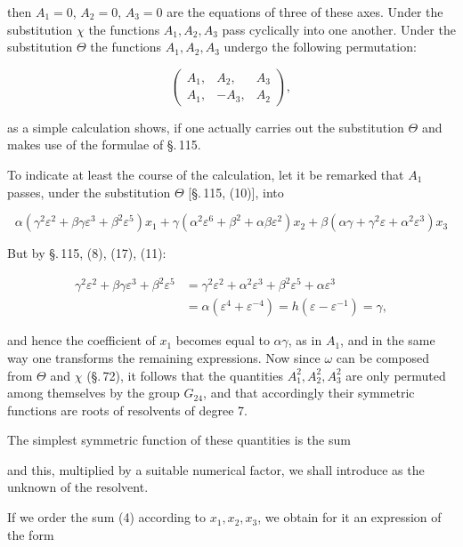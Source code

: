 
then $A_1=0$, $A_2=0$, $A_3=0$ are the equations of three of these axes. Under the substitution $\chi$ the functions $A_1, A_2, A_3$ pass cyclically into one another. Under the substitution $\Theta$ the functions $A_1, A_2, A_3$ undergo the following permutation:

\[
\begin{pmatrix} A_1, & A_2, & A_3 \\ A_1, & -A_3, & A_2 \end{pmatrix},
\]

as a simple calculation shows, if one actually carries out the substitution $\Theta$ and makes use of the formulae of \S.\,115.

To indicate at least the course of the calculation, let it be remarked that $A_1$ passes, under the substitution $\Theta$ [\S.\,115, (10)], into

\[
\alpha(\gamma^2\varepsilon^2 + \beta\gamma\varepsilon^3 + \beta^2\varepsilon^5)x_1 + \gamma(\alpha^2\varepsilon^6 + \beta^2 + \alpha\beta\varepsilon^2)x_2 + \beta(\alpha\gamma + \gamma^2\varepsilon + \alpha^2\varepsilon^3)x_3
\]

But by \S.\,115, (8), (17), (11):

\[
\begin{aligned}
\gamma^2\varepsilon^2 + \beta\gamma\varepsilon^3 + \beta^2\varepsilon^5 &= \gamma^2\varepsilon^2 + \alpha^2\varepsilon^3 + \beta^2\varepsilon^5 + \alpha\varepsilon^3 \\
&= \alpha(\varepsilon^4+\varepsilon^{-4}) = h(\varepsilon-\varepsilon^{-1}) = \gamma,
\end{aligned}
\]

and hence the coefficient of $x_1$ becomes equal to $\alpha\gamma$, as in $A_1$, and in the same way one transforms the remaining expressions. Now since $\omega$ can be composed from $\Theta$ and $\chi$ (\S.\,72), it follows that the quantities $A_1^2, A_2^2, A_3^2$ are only permuted among themselves by the group $G_{24}$, and that accordingly their symmetric functions are roots of resolvents of degree 7.

The simplest symmetric function of these quantities is the sum


and this, multiplied by a suitable numerical factor, we shall introduce as the unknown of the resolvent.

If we order the sum (4) according to $x_1, x_2, x_3$, we obtain for it an expression of the form

